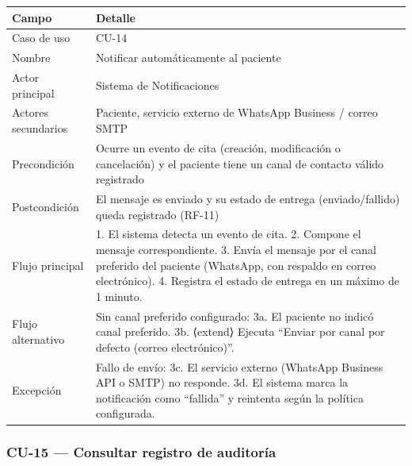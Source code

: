 \documentclass[11pt,a4paper]{article}
\begin{document}
	\begin{longtable}{p{} p{} }
		
		
		\toprule
		\textbf{Campo} &
		\textbf{Detalle}  \\
		\midrule
		\endhead
		
		Caso de uso & CU-14 \\
		Nombre & Notificar automáticamente al paciente \\
		Actor principal & Sistema de Notificaciones \\
		Actores secundarios & Paciente, servicio externo de WhatsApp Business / correo SMTP \\
		Precondición & Ocurre un evento de cita (creación, modificación o cancelación) y el paciente tiene un canal de contacto válido registrado \\
		Postcondición & El mensaje es enviado y su estado de entrega (enviado/fallido) queda registrado (RF-11) \\
		Flujo principal & 1. El sistema detecta un evento de cita. 2. Compone el mensaje correspondiente. 3. Envía el mensaje por el canal preferido del paciente (WhatsApp, con respaldo en correo electrónico). 4. Registra el estado de entrega en un máximo de 1 minuto. \\
		Flujo alternativo & Sin canal preferido configurado: 3a. El paciente no indicó canal preferido. 3b. ⟨extend⟩ Ejecuta ``Enviar por canal por defecto (correo electrónico)''. \\
		Excepción & Fallo de envío: 3c. El servicio externo (WhatsApp Business API o SMTP) no responde. 3d. El sistema marca la notificación como ``fallida'' y reintenta según la política configurada. \\
		\bottomrule
	\end{longtable}
	
	\subsubsection{CU-15 --- Consultar registro de auditoría}
	
\end{document}
